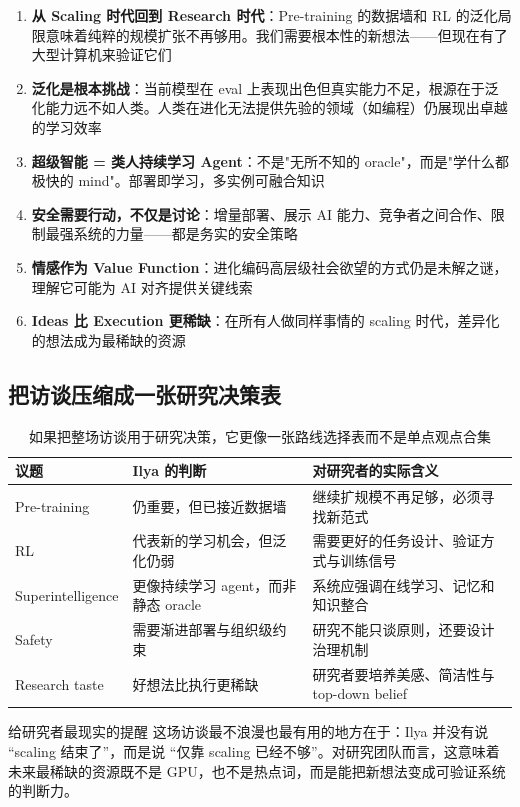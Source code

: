 \documentclass[a4paper]{article}
\begin{document}
\begin{enumerate}
    \item \textbf{从 Scaling 时代回到 Research 时代}：Pre-training 的数据墙和 RL 的泛化局限意味着纯粹的规模扩张不再够用。我们需要根本性的新想法——但现在有了大型计算机来验证它们
    \item \textbf{泛化是根本挑战}：当前模型在 eval 上表现出色但真实能力不足，根源在于泛化能力远不如人类。人类在进化无法提供先验的领域（如编程）仍展现出卓越的学习效率
    \item \textbf{超级智能 = 类人持续学习 Agent}：不是"无所不知的 oracle"，而是"学什么都极快的 mind"。部署即学习，多实例可融合知识
    \item \textbf{安全需要行动，不仅是讨论}：增量部署、展示 AI 能力、竞争者之间合作、限制最强系统的力量——都是务实的安全策略
    \item \textbf{情感作为 Value Function}：进化编码高层级社会欲望的方式仍是未解之谜，理解它可能为 AI 对齐提供关键线索
    \item \textbf{Ideas 比 Execution 更稀缺}：在所有人做同样事情的 scaling 时代，差异化的想法成为最稀缺的资源
\end{enumerate}

\subsection{把访谈压缩成一张研究决策表}

\begin{table}[H]
\centering
\begin{tabular}{p{3.1cm}p{3.8cm}p{4.6cm}}
\toprule
\textbf{议题} & \textbf{Ilya 的判断} & \textbf{对研究者的实际含义} \\
\midrule
Pre-training & 仍重要，但已接近数据墙 & 继续扩规模不再足够，必须寻找新范式 \\
RL & 代表新的学习机会，但泛化仍弱 & 需要更好的任务设计、验证方式与训练信号 \\
Superintelligence & 更像持续学习 agent，而非静态 oracle & 系统应强调在线学习、记忆和知识整合 \\
Safety & 需要渐进部署与组织级约束 & 研究不能只谈原则，还要设计治理机制 \\
Research taste & 好想法比执行更稀缺 & 研究者要培养美感、简洁性与 top-down belief \\
\bottomrule
\end{tabular}
\caption{如果把整场访谈用于研究决策，它更像一张路线选择表而不是单点观点合集}
\end{table}

\begin{importantbox}{给研究者最现实的提醒}
这场访谈最不浪漫也最有用的地方在于：Ilya 并没有说 ``scaling 结束了''，而是说 ``仅靠 scaling 已经不够''。对研究团队而言，这意味着未来最稀缺的资源既不是 GPU，也不是热点词，而是能把新想法变成可验证系统的判断力。
\end{importantbox}
\end{document}
